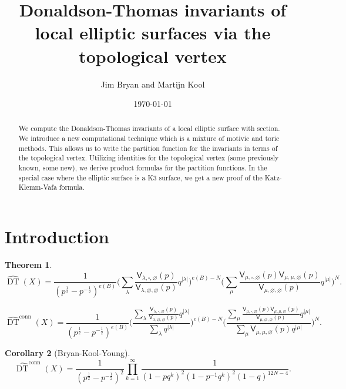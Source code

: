 \documentclass{amsart}
\title{Donaldson-Thomas invariants of local elliptic surfaces via the topological vertex}
\author{Jim Bryan and Martijn Kool}
\date{\today}
\newtheorem{theorem}{Theorem}%
\newtheorem{corollary}[theorem]{Corollary}
\theoremstyle{definition}
\newcommand{\sfV}{\mathsf{V}}
\newcommand{\DT}{\operatorname{DT}}
\newcommand{\conn}{\operatorname{conn}}
\begin{document}
\begin{abstract}

We compute the Donaldson-Thomas invariants of a local elliptic surface
with section. We introduce a new computational technique which is a
mixture of motivic and toric methods. This allows us to write the
partition function for the invariants in terms of the topological
vertex. Utilizing identities for the topological vertex (some
previously known, some new), we derive product formulas for the
partition functions. In the special case where the elliptic surface is
a K3 surface, we get a new proof of the Katz-Klemm-Vafa formula.
\end{abstract}

\maketitle 





\section{Introduction}

\begin{theorem}
$$
\widehat{\DT}(X) = \frac{1}{(p^{\frac{1}{2}} - p^{-\frac{1}{2}})^{e(B)}} \bigg( \sum_{\lambda} \frac{\sfV_{\lambda,\square,\varnothing}(p)}{\sfV_{\lambda,\varnothing,\varnothing}(p)} q^{|\lambda|} \bigg)^{e(B) - N}  \bigg( \sum_{\mu} \frac{\sfV_{\mu,\square,\varnothing}(p) \sfV_{\mu,\mu,\varnothing}(p)}{\sfV_{\mu,\varnothing,\varnothing}(p)} q^{|\mu|} \bigg)^{N}.
$$

$$
\widehat{\DT}^{\conn}(X) = \frac{1}{(p^{\frac{1}{2}} - p^{-\frac{1}{2}})^{e(B)}} \Bigg( \frac{\sum_{\lambda} \frac{\sfV_{\lambda,\square,\varnothing}(p)}{\sfV_{\lambda,\varnothing,\varnothing}(p)} q^{|\lambda|}}{\sum_{\lambda} q^{|\lambda|}} \Bigg)^{e(B) - N}  \bigg( \frac{\sum_{\mu} \frac{\sfV_{\mu,\square,\varnothing}(p) \sfV_{\mu,\mu,\varnothing}(p)}{\sfV_{\mu,\varnothing,\varnothing}(p)} q^{|\mu|}}{\sum_{\mu} \sfV_{\mu, \mu, \varnothing}(p) q^{|\mu|}} \Bigg)^{N}.
$$

\end{theorem}

\begin{corollary}[Bryan-Kool-Young]
$$
\widehat{\DT}^{\conn}(X) = \frac{1}{(p^{\frac{1}{2}} - p^{-\frac{1}{2}})^{2}} \prod_{k=1}^{\infty} \frac{1}{(1-p q^k)^2 (1-p^{-1} q^k)^2 (1-q)^{12N-4}}.
$$

\end{corollary}
\end{document}
